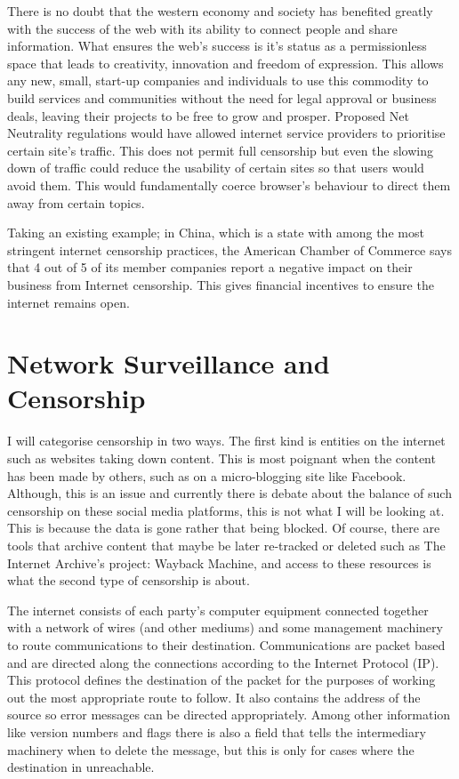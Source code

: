 \documentclass[10pt,a4paper]{article}
\begin{document}
There is no doubt that the western economy and society has benefited greatly with the success of the web with its ability to connect people and share information. What ensures the web's success is it's status as a permissionless space that leads to creativity, innovation and freedom of expression. This allows any new, small, start-up companies and individuals to use this commodity to build services and communities without the need for legal approval or business deals, leaving their projects to be free to grow and prosper. Proposed Net Neutrality regulations would have allowed internet service providers to prioritise certain site's traffic. This does not permit full censorship but even the slowing down of traffic could reduce the usability of certain sites so that users would avoid them. This would fundamentally coerce browser's behaviour to direct them away from certain topics.

Taking an existing example; in China, which is a state with among the most stringent internet censorship practices, the American Chamber of Commerce\cite{amcham} says that 4 out of 5 of its member companies report a negative impact on their business from Internet censorship. This gives financial incentives to ensure the internet remains open.

\section{Network Surveillance and Censorship}

I will categorise censorship in two ways. The first kind is entities on the internet such as websites taking down content. This is most poignant when the content has been made by others, such as on a micro-blogging site like Facebook. Although, this is an issue and currently there is debate about the balance of such censorship on these social media platforms, this is not what I will be looking at. This is because the data is gone rather that being blocked. Of course, there are tools that archive content that maybe be later re-tracked or deleted such as The Internet Archive's project: Wayback Machine\cite{wb}, and access to these resources is what the second type of censorship is about.

The internet consists of each party's computer equipment connected together with a network of wires (and other mediums) and some management machinery to route communications to their destination.  Communications are packet based and are directed along the connections according to the Internet Protocol (IP)\cite{ip4}. This protocol defines the destination of the packet for the purposes of working out the most appropriate route to follow. It also contains the address of the source so error messages can be directed appropriately. Among other information like version numbers and flags there is also a field that tells the intermediary machinery when to delete the message, but this is only for cases where the destination in unreachable. 
\end{document}
